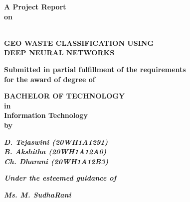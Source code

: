\documentclass[12pt, English]{article}
\begin{document}
\begin{titlepage}

\begin{center}
\vspace*{-1in}

\begin{Large}
\vspace*{0.1in}
\textbf{A Project Report\\on}
\end{Large}
\vspace*{0.0in}
\textbf{\Large \\ GEO WASTE CLASSIFICATION USING}
\textbf{\Large \\ DEEP NEURAL NETWORKS}

\begin{large}
\textbf{{Submitted in partial fulfillment of the requirements \\
for the award of degree of}}\\
\end{large}
\begin{large}
{\textbf{BACHELOR OF TECHNOLOGY \\ in\\ Information Technology\\by}}\\
\end{large}

\textit{\textbf{\large D. Tejaswini (20WH1A1291)}} \\
\textit{\textbf{\large B. Akshitha (20WH1A12A0)}} \\
\textit{\textbf{\large Ch. Dharani (20WH1A12B3)}} \\

\begin{large}
\textit{\textbf{Under the esteemed guidance of}}\\
\end{large}
\textbf{\large \textit {Ms. M. SudhaRani }}\\


\end{center}
\end{titlepage}
\end{document}
